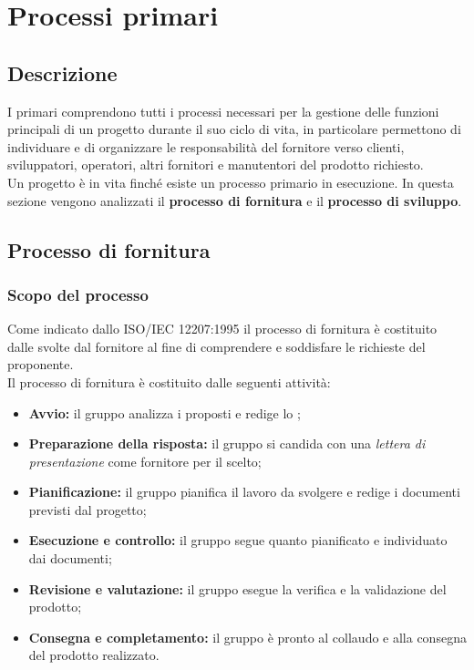\section{Processi primari}
\label{PP}
\subsection{Descrizione}\label{PP_Descrizione}
I  primari comprendono tutti i processi necessari per la gestione delle funzioni principali di un progetto durante il suo ciclo di vita, in particolare permettono di individuare e di organizzare le responsabilità del fornitore verso clienti, sviluppatori, operatori, altri fornitori e manutentori del prodotto richiesto.\\
Un progetto è in vita finché esiste un processo primario in esecuzione.
In questa sezione vengono analizzati il \textbf{processo di fornitura} e il \textbf{processo di sviluppo}.

\subsection{Processo di fornitura}
\subsubsection{Scopo del processo}\label{PF_Scopo}
Come indicato dallo  ISO/IEC 12207:1995 il processo di fornitura è costituito dalle  svolte dal fornitore al fine di comprendere e soddisfare le richieste del proponente.\\
Il processo di fornitura è costituito dalle seguenti attività:
\begin{itemize}
	\item \textbf{Avvio:} il gruppo analizza i  proposti e redige lo \SdF{};
	\item \textbf{Preparazione della risposta:} il gruppo si candida con una \textit{lettera di presentazione} come fornitore per il  scelto;
	\item \textbf{Pianificazione:} il gruppo pianifica il lavoro da svolgere e redige i documenti previsti dal progetto;
	\item \textbf{Esecuzione e controllo:} il gruppo segue quanto pianificato e individuato dai documenti;
	\item \textbf{Revisione e valutazione:} il gruppo esegue la verifica e la validazione del prodotto;
	\item \textbf{Consegna e completamento:} il gruppo è pronto al collaudo e alla consegna del prodotto realizzato.
\end{itemize}

